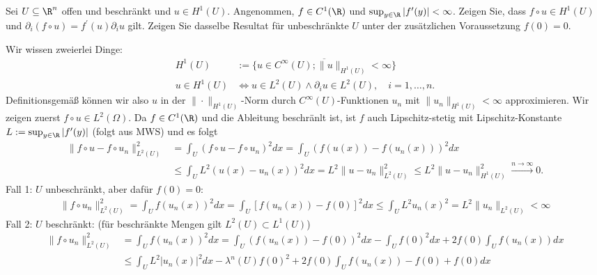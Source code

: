 
\begin{exercise}

Sei $U \subseteq \R^n$ offen und beschränkt und $u \in H^1(U)$.
Angenommen, $f \in C^1(\R)$ und $\sup_{y \in \R} |f^\prime(y)| < \infty$. Zeigen Sie, dass $f \circ u \in H^1(U)$ und $\partial_i(f \circ u) = f^\prime(u) \partial_i u$ gilt.
Zeigen Sie dasselbe Resultat für unbeschränkte $U$ unter der zusätzlichen Voraussetzung $f(0) = 0$.

\end{exercise}


\begin{solution}
Wir wissen zweierlei Dinge:
\begin{align*}
  H^1(U) &:= \overline{\{u \in C^{\infty}(U); \|u\|_{H^1(U)} < \infty\}} \\
  u \in H^1(U) &\iff u \in L^2(U) \land \partial_i u \in L^2(U), \quad i=1,\dots,n.
\end{align*}
Definitionsgemäß können wir also $u$ in der $\|\cdot\|_{H^1(U)}$-Norm durch
$C^{\infty}(U)$-Funktionen $u_n$ mit $\|u_n\|_{H^1(U)} < \infty$ approximieren.
Wir zeigen zuerst $f \circ u \in L^2(\Omega)$. Da $f \in C^1(\R)$ und die Ableitung
beschränlt ist, ist $f$ auch Lipschitz-stetig mit Lipschitz-Konstante $L := \sup_{y \in \R} |f^\prime(y)|$ (folgt aus MWS) und es folgt
\begin{align*}
  \|f\circ u - f\circ u_n\|_{L^2(U)}^2 &= \int_U (f \circ u - f\circ u_n)^2 dx
  = \int_U (f(u(x))- f(u_n(x)))^2 dx \\
  &\leq \int_U L^2(u(x) - u_n(x))^2 dx = L^2\|u - u_n\|_{L^2(U)}^2
  \leq L^2\|u - u_n\|_{H^1(U)}^2  \xrightarrow{n \to \infty} 0.
\end{align*}
Fall 1: $U$ unbeschränkt, aber dafür $f(0) = 0$:
\begin{align*}
  \|f\circ u_n\|_{L^2(U)}^2 = \int_U f(u_n(x))^2dx = \int_U [f(u_n(x)) - f(0)]^2 dx
  \leq \int_U L^2u_n(x)^2 = L^2\|u_n\|_{L^2(U)} < \infty
\end{align*}
Fall 2: $U$ beschränkt: (für beschränkte Mengen gilt $L^2(U) \subset L^1(U)$)
\begin{align*}
  \|f\circ u_n\|_{L^2(U)}^2 &= \int_U f(u_n(x))^2dx = \int_U (f(u_n(x)) - f(0))^2 dx - \int_U f(0)^2 dx + 2f(0) \int_U f(u_n(x)) dx \\
  &\leq \int_U L^2 |u_n(x)|^2 dx - \lambda^n(U)f(0)^2 + 2f(0) \int_U f(u_n(x)) -f(0) + f(0) dx \\

\end{align*}
\end{solution}
